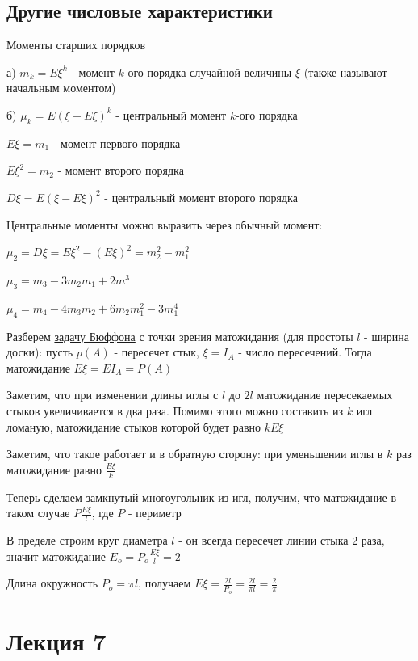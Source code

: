 \documentclass[12pt]{article}
\begin{document}
    \subsection{Другие числовые характеристики}

    Моменты старших порядков

    а) $m_k = E\xi^k$ - момент $k$-ого порядка случайной величины $\xi$ (также называют начальным моментом)

    б) $\mu_k = E(\xi - E\xi)^k$ - центральный момент $k$-ого порядка

    $E\xi = m_1$ - момент первого порядка

    $E\xi^2 = m_2$ - момент второго порядка

    $D\xi = E(\xi - E\xi)^2$ - центральный момент второго порядка

    \Nota Центральные моменты можно выразить через обычный момент:

    $\mu_2 = D\xi = E\xi^2 - (E\xi)^2 = m_2^2 - m_1^2$

    $\mu_3 = m_3 - 3m_2 m_1 + 2m^3$

    $\mu_4 = m_4 - 4m_3 m_2 + 6m_2 m_1^2 - 3m_1^4$

    \Ex Разберем \hyperlink{buffonsproblem}{задачу Бюффона} с точки зрения матожидания (для простоты $l$ - ширина доски): пусть $p(A)$ - пересечет стык,
    $\xi = I_A$ - число пересечений. Тогда матожидание $E\xi = E I_A = P(A)$

    Заметим, что при изменении длины иглы с $l$ до $2l$ матожидание пересекаемых стыков увеличивается
    в два раза. Помимо этого можно составить из $k$ игл ломаную, матожидание стыков которой будет равно $kE\xi$

    Заметим, что такое работает и в обратную сторону: при уменьшении иглы в $k$ раз матожидание равно $\frac{E\xi}{k}$

    Теперь сделаем замкнутый многоугольник из игл, получим, что матожидание в таком случае $P\frac{E\xi}{l}$, где $P$ - периметр

    В пределе строим круг диаметра $l$ - он всегда пересечет линии стыка 2 раза, значит матожидание $E_o = P_o\frac{E\xi}{l} = 2$

    Длина окружность $P_o = \pi l$, получаем $E\xi = \frac{2l}{P_o} = \frac{2l}{\pi l} = \frac{2}{\pi}$


    \section{Лекция 7}
\end{document}
